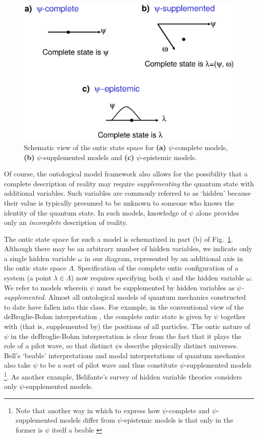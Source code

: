 \documentclass[aps,nofootinbib,12pt]{revtex4-2}
\begin{document}
\begin{figure}[t]
\includegraphics[scale=0.4]{classes}\caption{Schematic view of the ontic state
space for \textbf{(a)} $\psi$-complete models, \textbf{(b)}
$\psi$-supplemented
models and \textbf{(c)} $\psi$-epistemic models.}%
\label{FIG:classes}%
\end{figure}


Of course, the ontological model framework also allows for the
possibility that a complete description of reality may require
\textit{supplementing} the quantum state with additional variables.
Such variables are commonly referred to as `hidden' because their
value is typically presumed to be unknown to someone who knows the
identity of the quantum state. In such models, knowledge of $\psi$
alone provides only an \textit{incomplete} description of reality.

The ontic state space for such a model is schematized in part (b) of
Fig.~\ref{FIG:classes}. Although there may be an arbitrary number of
hidden variables, we indicate only a single hidden variable $\omega$
in our diagram, represented by an additional axis in the ontic state
space $\Lambda.$ Specification of the complete ontic configuration
of a system (a point $\lambda\in\Lambda$) now requires specifying
both $\psi$ and the hidden variable $\omega$. We refer to models
wherein $\psi$ must be supplemented by hidden variables as $\psi
$\emph{-supplemented}. Almost all ontological models of quantum
mechanics constructed to date have fallen into this class. For
example, in the conventional view of the deBroglie-Bohm
interpretation \cite{bohm,bohmsurvey}, the complete ontic state is
given by $\psi$ together with (that is, supplemented by) the
positions of all particles. The ontic nature of\ $\psi$ in the
deBroglie-Bohm interpretation is clear from the fact that it plays
the role of a pilot wave, so that distinct $\psi$s describe
physically distinct universes. Bell's `beable' interpretations
\cite{beables} and modal interpretations of quantum mechanics
\cite{modalrefs1,modalrefs2,modalrefs3,modalrefs4} also take $\psi$
to be a sort of pilot wave and thus constitute $\psi$-supplemented
models \footnote{Note that another way in which to express how
$\psi$-complete and $\psi$-supplemented models differ from
$\psi$-epistemic models is that only in the former is $\psi$ itself
a beable \cite{beables}}. As another example, Belifante's survey of
hidden variable theories \cite{Belifante} considers only
$\psi$-supplemented models.
\end{document}
